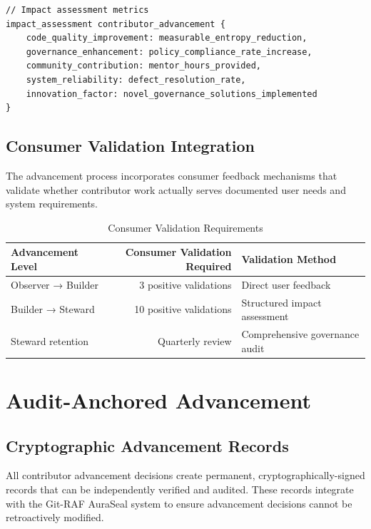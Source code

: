 \begin{lstlisting}[style=riftlang, language=rift]
// Impact assessment metrics
impact_assessment contributor_advancement {
    code_quality_improvement: measurable_entropy_reduction,
    governance_enhancement: policy_compliance_rate_increase,
    community_contribution: mentor_hours_provided,
    system_reliability: defect_resolution_rate,
    innovation_factor: novel_governance_solutions_implemented
}
\end{lstlisting}

\subsection{Consumer Validation Integration}

The advancement process incorporates consumer feedback mechanisms that validate whether contributor work actually serves documented user needs and system requirements.

\begin{table}[h]
\centering
\begin{tabular}{|l|r|l|}
\hline
\textbf{Advancement Level} & \textbf{Consumer Validation Required} & \textbf{Validation Method} \\
\hline
Observer → Builder & 3 positive validations & Direct user feedback \\
Builder → Steward & 10 positive validations & Structured impact assessment \\
Steward retention & Quarterly review & Comprehensive governance audit \\
\hline
\end{tabular}
\caption{Consumer Validation Requirements}
\label{tab:consumer_validation}
\end{table}

\section{Audit-Anchored Advancement}

\subsection{Cryptographic Advancement Records}

All contributor advancement decisions create permanent, cryptographically-signed records that can be independently verified and audited. These records integrate with the Git-RAF AuraSeal system to ensure advancement decisions cannot be retroactively modified.

